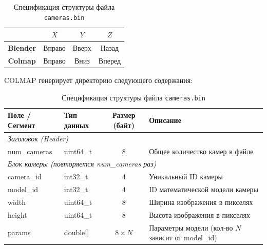 \begin{table}[htbp]
	\centering
	\begin{tabular}{|c|c|c|c|}
		\hline
		& $X$ & $Y$ & $Z$ \\
		\hline
		\textbf{Blender} & Вправо & Вверх & Назад \\
		\hline
		\textbf{Colmap} & Вправо & Вниз & Вперед \\
		\hline
	\end{tabular}
	\caption{Спецификация структуры файла \texttt{cameras.bin}}
	\label{tab:colmap_blender_cameras}
\end{table}

\noindent COLMAP генерирует директорию следующего содержания:

\noindent
{}

\begin{table}[htbp]
	\centering
	\begin{tabularx}{\textwidth}{llcX}
		\toprule
		\textbf{Поле / Сегмент} & \textbf{Тип данных} & \textbf{Размер (байт)} & \textbf{Описание} \\
		\midrule
		\multicolumn{4}{l}{\textit{Заголовок (Header)}} \\
		\quad num\_cameras & uint64\_t & 8 & Общее количество камер в файле \\
		\midrule
		\multicolumn{4}{l}{\textit{Блок камеры (повторяется num\_cameras раз)}} \\
		\quad camera\_id & int32\_t & 4 & Уникальный ID камеры \\
		\quad model\_id & int32\_t & 4 & ID математической модели камеры \\
		\quad width & uint64\_t & 8 & Ширина изображения в пикселях \\
		\quad height & uint64\_t & 8 & Высота изображения в пикселях \\
		\quad params & double[] & $8 \times N$ & Параметры модели (кол-во $N$ зависит от model\_id) \\
		\bottomrule
	\end{tabularx}
	\caption{Спецификация структуры файла \texttt{cameras.bin}}
	\label{tab:cameras_bin}
\end{table}

